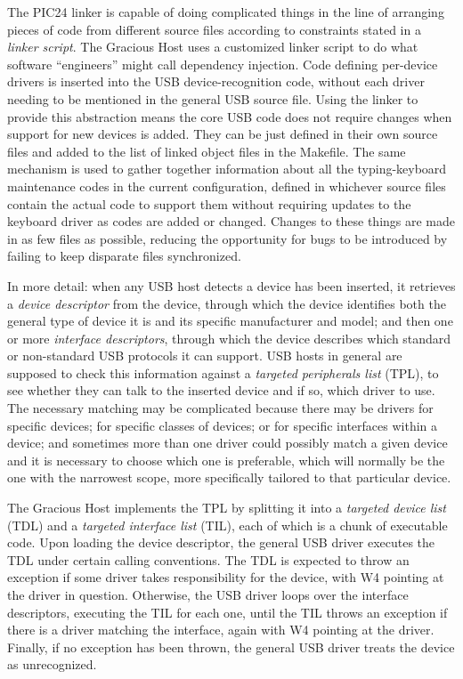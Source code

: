 The PIC24 linker is capable of doing complicated things in the line of
arranging pieces of code from different source files according to
constraints stated in a \emph{linker script}.  The Gracious Host uses a
customized linker script to do what software ``engineers'' might call
dependency injection.  Code defining per-device drivers is inserted into the
USB device-recognition code, without each driver needing to be mentioned in
the general USB source file.  Using the linker to provide this abstraction
means the core USB code does not require changes when support for new
devices is added.  They can be just defined in their own source files and
added to the list of linked object files in the Makefile.  The same
mechanism is used to gather together information about all the
typing-keyboard maintenance codes in the current configuration, defined in
whichever source files contain the actual code to support them without
requiring updates to the keyboard driver as codes are added or changed. 
Changes to these things are made in as few files as possible, reducing the
opportunity for bugs to be introduced by failing to keep disparate files
synchronized.

In more detail:  when any USB host detects a device has been inserted, it
retrieves a \emph{device descriptor} from the device, through which the
device identifies both the general type of device it is and its specific
manufacturer and model; and then one or more \emph{interface descriptors},
through which the device describes which standard or non-standard USB
protocols it can support.  USB hosts in general are supposed to check this
information against a \emph{targeted peripherals list} (TPL), to see whether
they can talk to the inserted device and if so, which driver to use.  The
necessary matching may be complicated because there may be drivers for
specific devices; for specific classes of devices; or for specific
interfaces within a device; and sometimes more than one driver could
possibly match a given device and it is necessary to choose which one is
preferable, which will normally be the one with the narrowest scope, more
specifically tailored to that particular device.

The Gracious Host implements the TPL by splitting it into a \emph{targeted
device list} (TDL) and a \emph{targeted interface list} (TIL), each of which
is a chunk of executable code.  Upon loading the device descriptor, the
general USB driver executes the TDL under certain calling conventions.  The
TDL is expected to throw an exception if some driver takes responsibility
for the device, with W4 pointing at the driver in question.  Otherwise, the
USB driver loops over the interface descriptors, executing the TIL for each
one, until the TIL throws an exception if there is a driver matching the
interface, again with W4 pointing at the driver.  Finally, if no exception
has been thrown, the general USB driver treats the device as unrecognized.

